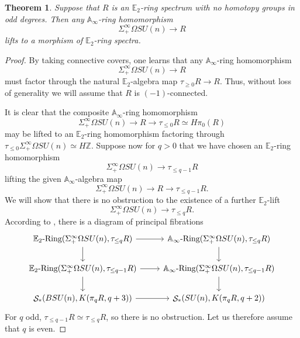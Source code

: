 \documentclass[reqno, oneside]{amsart}
\theoremstyle{definition}
\theoremstyle{plain}
\newtheorem{thm}[nul]{Theorem}
\DeclareMathOperator{\cS}{\mathcal{S}}
\begin{document}
\begin{thm}
Suppose that $R$ is an $\mathbb{E}_2$-ring spectrum with no homotopy groups in odd degrees.  Then any $\mathbb{A}_\infty$-ring homomorphism
$$\Sigma^{\infty}_+ \Omega SU(n) \rightarrow R$$
lifts to a morphism of $\mathbb{E}_2$-ring spectra.
\end{thm}

\begin{proof} 
By taking connective covers, one learns that any $\mathbb{A}_\infty$-ring homomorphism
$$\Sigma^{\infty}_+ \Omega SU(n) \rightarrow R$$
must factor through the natural $\mathbb{E}_2$-algebra map $\tau_{\ge 0} R \rightarrow R$.  Thus, without loss of generality we will assume that $R$ is $(-1)$-connected.

It is clear that the composite $\mathbb{A}_\infty$-ring homomorphism
$$\Sigma^{\infty}_+ \Omega SU(n) \longrightarrow R \longrightarrow \tau_{\le 0} R \simeq H\pi_0(R)$$
may be lifted to an $\mathbb{E}_2$-ring homomorphism factoring through $\tau_{\le 0} \Sigma^{\infty}_+ \Omega SU(n) \simeq H\mathbb{Z}$.   Suppose now for $q>0$ that we have chosen an $\mathbb{E}_2$-ring homomorphism 
$$\Sigma^{\infty}_+ \Omega SU(n) \longrightarrow \tau_{\le q-1} R$$
lifting the given $\mathbb{A}_\infty$-algebra map
$$\Sigma^{\infty}_+ \Omega SU(n) \longrightarrow R \longrightarrow \tau_{\le q-1} R.$$
We will show that there is no obstruction to the existence of a further $\mathbb{E}_2$-lift $$\Sigma^{\infty}_+ \Omega SU(n) \longrightarrow \tau_{\le q} R.$$
According to \cite[Theorem $4.1$]{ChadwickMandell}, there is a diagram of principal fibrations
$$
\begin{tikzcd}
\mathbb{E}_2\text{-Ring}(\Sigma^{\infty}_+ \Omega SU(n), \tau_{\le q} R) \arrow{r} \arrow{d} & \mathbb{A}_\infty\text{-Ring}(\Sigma^{\infty}_+ \Omega SU(n), \tau_{\le q} R) \arrow{d} \\
\mathbb{E}_2\text{-Ring}(\Sigma^{\infty}_+ \Omega SU(n), \tau_{\le q-1} R) \arrow{r} \arrow{d} & \mathbb{A}_\infty\text{-Ring}(\Sigma^{\infty}_+ \Omega SU(n), \tau_{\le q-1} R) \arrow{d} \\
\cS_*(BSU(n),K(\pi_q R,q+3)) \arrow{r} & \cS_*(SU(n),K(\pi_q R,q+2))
\end{tikzcd}
$$
For $q$ odd, $\tau_{\le q-1} R \simeq \tau_{\le q} R$, so there is no obstruction.  Let us therefore assume that $q$ is even.


\end{proof}
\end{document}

